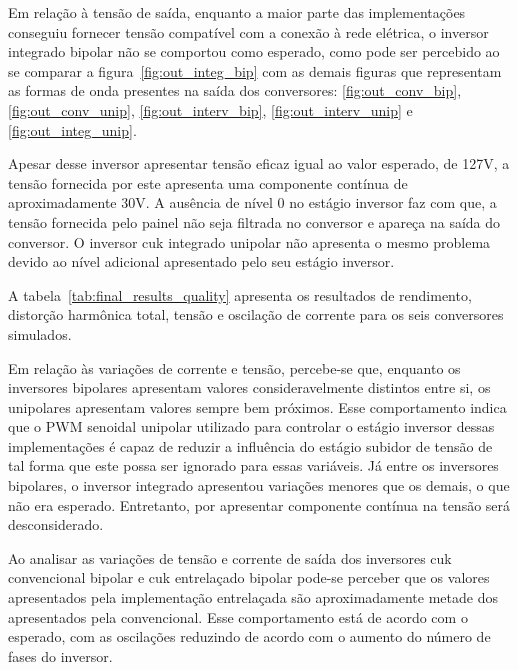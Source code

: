 \documentclass[
	12pt,				%
	openright,			%
	twoside,			%
	a4paper,			%
	english,			%
	french,				%
	spanish,			%
	brazil,				%
	]{abntex2}
\begin{document}
Em relação à tensão de saída, enquanto a maior parte das implementações conseguiu fornecer tensão compatível com a conexão à rede elétrica, o inversor integrado bipolar não se comportou como esperado, como pode ser percebido ao se comparar a figura~\ref{fig:out_integ_bip} com as demais figuras que representam as formas de onda presentes na saída dos conversores: \ref{fig:out_conv_bip}, \ref{fig:out_conv_unip}, \ref{fig:out_interv_bip}, \ref{fig:out_interv_unip} e \ref{fig:out_integ_unip}.

Apesar desse inversor apresentar tensão eficaz igual ao valor esperado, de 127V, a tensão fornecida por este apresenta uma componente contínua de aproximadamente 30V. A ausência de nível 0 no estágio inversor faz com que, a tensão fornecida pelo painel não seja filtrada no conversor e apareça na saída do conversor. O inversor cuk integrado unipolar não apresenta o mesmo problema devido ao nível adicional apresentado pelo seu estágio inversor.

A tabela~\ref{tab:final_results_quality} apresenta os resultados de rendimento, distorção harmônica total, tensão e oscilação de corrente para os seis conversores simulados.

Em relação às variações de corrente e tensão, percebe-se que, enquanto os inversores bipolares apresentam valores consideravelmente distintos entre si, os unipolares apresentam valores sempre bem próximos. Esse comportamento indica que o PWM senoidal unipolar utilizado para controlar o estágio inversor dessas implementações é capaz de reduzir a influência do estágio subidor de tensão de tal forma que este possa ser ignorado para essas variáveis. Já entre os inversores bipolares, o inversor integrado apresentou variações menores que os demais, o que não era esperado. Entretanto, por apresentar componente contínua na tensão será desconsiderado.

Ao analisar as variações de tensão e corrente de saída dos inversores cuk convencional bipolar e cuk entrelaçado bipolar pode-se perceber que os valores apresentados pela implementação entrelaçada são aproximadamente metade dos apresentados pela convencional. Esse comportamento está de acordo com o esperado, com as oscilações reduzindo de acordo com o aumento do número de fases do inversor.
\end{document}
